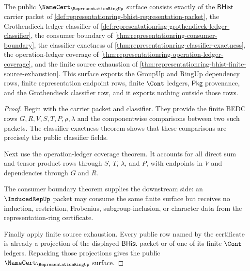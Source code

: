 \begin{theorem}
\label{thm:representationring-public-namecert-surface}
The public $\NameCert_{\RepresentationRingUp}$ surface consists exactly of
the $\mathsf{BHist}$ carrier packet of
\autoref{def:representationring-bhist-representation-packet}, the
Grothendieck ledger classifier of
\autoref{def:representationring-grothendieck-ledger-classifier}, the
consumer boundary of \autoref{thm:representationring-consumer-boundary}, the
classifier exactness of \autoref{thm:representationring-classifier-exactness},
the operation-ledger coverage of
\autoref{thm:representationring-operation-ledger-coverage}, and the finite
source exhaustion of
\autoref{thm:representationring-bhist-finite-source-exhaustion}. This surface
exports the GroupUp and RingUp dependency rows, finite representation
endpoint rows, finite $\Cont$ ledgers, $\mathsf{Pkg}$ provenance, and the
Grothendieck classifier row, and it exports nothing outside those rows.
\end{theorem}
\begin{proof}
Begin with the carrier packet and classifier. They provide the finite BEDC
rows $G,R,V,S,T,P,\rho,\lambda$ and the componentwise comparisons between
two such packets. The classifier exactness theorem shows that these
comparisons are precisely the public classifier fields.

Next use the operation-ledger coverage theorem. It accounts for all direct
sum and tensor product rows through $S$, $T$, $\lambda$, and $P$, with
endpoints in $V$ and dependencies through $G$ and $R$.

The consumer boundary theorem supplies the downstream side: an
$\InducedRepUp$ packet may consume the same finite surface but receives no
induction, restriction, Frobenius, subgroup-inclusion, or character data from
the representation-ring certificate.

Finally apply finite source exhaustion. Every public row named by the
certificate is already a projection of the displayed $\mathsf{BHist}$ packet
or of one of its finite $\Cont$ ledgers. Repacking those projections gives
the public $\NameCert_{\RepresentationRingUp}$ surface.
\end{proof}

